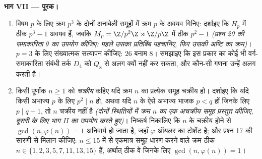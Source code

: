 \begin{problem}
\medskip
\noindent\textbf{भाग VII --- पूरक।}
\begin{enumerate}[resume]
  \item विषम $p$ के लिए क्रम $p^3$ के दोनों अनाबेली समूहों
        में क्रम $p$ के अवयव गिनिए: दर्शाइए कि $H_p$ में ठीक
        $p^3 - 1$ अवयव हैं, जबकि $M_p =
        \Z/p^2\Z \rtimes \Z/p\Z$ में ठीक $p^2 - 1$
        \emph{(प्रश्न 20 की समाकारिता $\theta$ का उपयोग कीजिए:
        पहले उसका प्रतिबिंब पहचानिए, फिर उसकी अष्टि का क्रम)}।
        $p = 3$ के लिए संख्यात्मक सत्यापन कीजिए: $26$ बनाम
        $8$। समझाइए कि इस प्रकार का कोई भी वर्ग-समाकारिता
        संबंधी तर्क $D_4$ को $Q_8$ से अलग क्यों नहीं कर सकता,
        और कौन-सी गणना उन्हें अलग करती है।
  \item किसी पूर्णांक $n \geq 1$ को \emph{चक्रीय} कहिए यदि क्रम
        $n$ का प्रत्येक समूह चक्रीय हो। दर्शाइए कि यदि किसी
        अभाज्य $p$ के लिए $p^2 \mid n$ हो, अथवा यदि $n$ के ऐसे
        अभाज्य भाजक $p < q$ हों जिनके लिए $p \mid q - 1$, तो $n$
        चक्रीय नहीं है \emph{(दोनों स्थितियों में क्रम $n$
        का एक अचक्रीय समूह प्रस्तुत कीजिए, दूसरी के लिए भाग II
        का उपयोग करते हुए)}। निष्कर्ष निकालिए कि $n$ के
        चक्रीय होने से $\gcd(n, \varphi(n)) = 1$ अनिवार्य हो जाता है, जहाँ $\varphi$
        ऑयलर का टोशेंट है; और प्रश्न 17 की सारणी से मिलान
        कीजिए: $n \leq 15$ में से एकमात्र समूह धारण करने वाले क्रम
        ठीक $n \in \{1, 2, 3, 5, 7, 11, 13, 15\}$ हैं, अर्थात् ठीक वे जिनके लिए $\gcd(n, \varphi(n)) = 1$।
\end{enumerate}
\end{problem}
